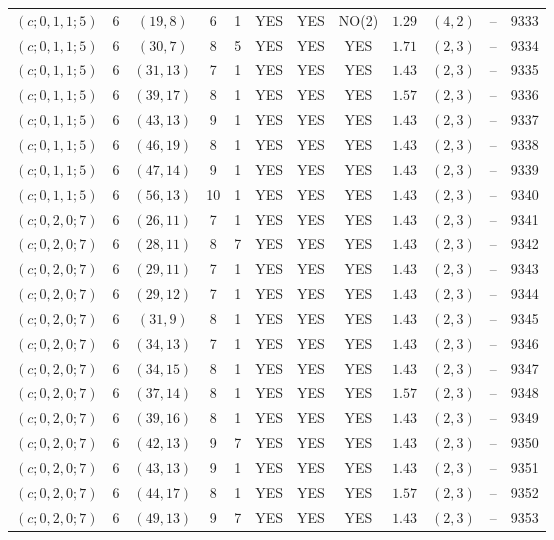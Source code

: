 \begin{longtable}{|c|c|c|c|c|c|c|c|c|c|c|c|}
$(c;0,1,1;5)$ & 6 & $(19,8)$ & 6 & 1 & YES & YES & NO(2) & $1.29$ & $(4,2)$ & -- & 9333\\
$(c;0,1,1;5)$ & 6 & $(30,7)$ & 8 & 5 & YES & YES & YES & $1.71$ & $(2,3)$ & -- & 9334\\
$(c;0,1,1;5)$ & 6 & $(31,13)$ & 7 & 1 & YES & YES & YES & $1.43$ & $(2,3)$ & -- & 9335\\
$(c;0,1,1;5)$ & 6 & $(39,17)$ & 8 & 1 & YES & YES & YES & $1.57$ & $(2,3)$ & -- & 9336\\
$(c;0,1,1;5)$ & 6 & $(43,13)$ & 9 & 1 & YES & YES & YES & $1.43$ & $(2,3)$ & -- & 9337\\
$(c;0,1,1;5)$ & 6 & $(46,19)$ & 8 & 1 & YES & YES & YES & $1.43$ & $(2,3)$ & -- & 9338\\
$(c;0,1,1;5)$ & 6 & $(47,14)$ & 9 & 1 & YES & YES & YES & $1.43$ & $(2,3)$ & -- & 9339\\
$(c;0,1,1;5)$ & 6 & $(56,13)$ & 10 & 1 & YES & YES & YES & $1.43$ & $(2,3)$ & -- & 9340\\
$(c;0,2,0;7)$ & 6 & $(26,11)$ & 7 & 1 & YES & YES & YES & $1.43$ & $(2,3)$ & -- & 9341\\
$(c;0,2,0;7)$ & 6 & $(28,11)$ & 8 & 7 & YES & YES & YES & $1.43$ & $(2,3)$ & -- & 9342\\
$(c;0,2,0;7)$ & 6 & $(29,11)$ & 7 & 1 & YES & YES & YES & $1.43$ & $(2,3)$ & -- & 9343\\
$(c;0,2,0;7)$ & 6 & $(29,12)$ & 7 & 1 & YES & YES & YES & $1.43$ & $(2,3)$ & -- & 9344\\
$(c;0,2,0;7)$ & 6 & $(31,9)$ & 8 & 1 & YES & YES & YES & $1.43$ & $(2,3)$ & -- & 9345\\
$(c;0,2,0;7)$ & 6 & $(34,13)$ & 7 & 1 & YES & YES & YES & $1.43$ & $(2,3)$ & -- & 9346\\
$(c;0,2,0;7)$ & 6 & $(34,15)$ & 8 & 1 & YES & YES & YES & $1.43$ & $(2,3)$ & -- & 9347\\
$(c;0,2,0;7)$ & 6 & $(37,14)$ & 8 & 1 & YES & YES & YES & $1.57$ & $(2,3)$ & -- & 9348\\
$(c;0,2,0;7)$ & 6 & $(39,16)$ & 8 & 1 & YES & YES & YES & $1.43$ & $(2,3)$ & -- & 9349\\
$(c;0,2,0;7)$ & 6 & $(42,13)$ & 9 & 7 & YES & YES & YES & $1.43$ & $(2,3)$ & -- & 9350\\
$(c;0,2,0;7)$ & 6 & $(43,13)$ & 9 & 1 & YES & YES & YES & $1.43$ & $(2,3)$ & -- & 9351\\
$(c;0,2,0;7)$ & 6 & $(44,17)$ & 8 & 1 & YES & YES & YES & $1.57$ & $(2,3)$ & -- & 9352\\
$(c;0,2,0;7)$ & 6 & $(49,13)$ & 9 & 7 & YES & YES & YES & $1.43$ & $(2,3)$ & -- & 9353\\

\end{longtable}
